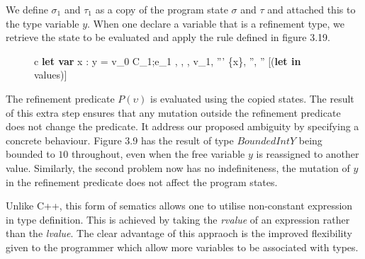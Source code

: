 \documentclass[a4paper,12pt]{report}
\begin{document}
\par
We define $\sigma_1$ and $\tau_1$ as a copy of the program state $\sigma$ and 
$\tau$ and attached this to the type variable $y$. 
When one declare a variable that is a refinement type, we retrieve the state to 
be evaluated and apply the rule defined in figure 3.19.

\begin{figure}[H]
  \begin{center}
    \begin{tabular}{c}
      {\langle\textbf{let var }x : y = v_0  C_1;e_1 , \sigma, \tau,  \rangle 
      \Longrightarrow \langle v_1, \sigma''' \setminus \{x\}, \tau'', '' \rangle} [(\textbf{let in} values)] 
    \end{tabular}
  \end{center}
\end{figure}


\par
The refinement predicate $P(\upsilon)$ is evaluated using the copied 
states. The result of this extra step ensures that any mutation outside the 
refinement predicate does not change the predicate. It address our proposed 
ambiguity by specifying a concrete behaviour. Figure 3.9 has the result of type 
$BoundedIntY$ being bounded to $10$ throughout, even when the free variable $y$ 
is reassigned to another value. Similarly, the second problem now has no 
indefiniteness, the mutation of $y$ in the refinement predicate does not affect 
the program states. 
 
\par
Unlike C++, this form of sematics allows one to utilise non-constant expression 
in type definition. This is achieved by taking the \textit{rvalue} \cite{cpplrvalues} 
of an expression rather than the \textit{lvalue}. The clear advantage of this 
appraoch is the improved flexibility given to the programmer which allow more 
variables to be associated with types. 
\end{document}
